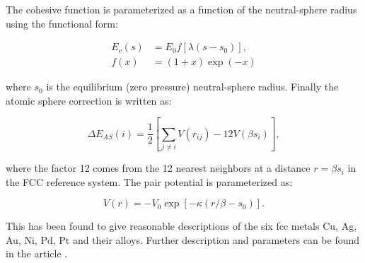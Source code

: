 The cohesive function is parameterized as a function
of the neutral-sphere radius using the functional form:

\begin{equation}
    \begin{split}
        E_c (s) &= E_0 f\left[ \lambda \left( s - s_0 \right) \right], \\
        f\left( x \right) &= \left( 1 + x \right) \exp \left( - x \right)
    \end{split}
\end{equation}

where $s_0$ is the equilibrium (zero pressure) neutral-sphere radius.
Finally the atomic sphere correction is written as:

\begin{equation}
    \Delta E_{AS}(i) = \frac{1}{2} \left[ \sum_{j \neq i} V(r_{ij})
    - 12 V(\beta s_i) \right],
\end{equation}

where the factor 12 comes from the 12 nearest neighbors at
a distance $r = \beta s_i$ in the FCC reference system.
The pair potential is parameterized as:

\begin{equation}
    V(r) = - V_0 \exp \left[ - \kappa \left( r/\beta - s_0 \right) \right] .
\end{equation}

This has been found to give reasonable descriptions
of the six fcc metals Cu, Ag, Au, Ni, Pd, Pt and their alloys.
Further description and parameters can be found in the article
\parencite[Jacobsen, K.W.;
Stoltze, P. and Nørskov, J.K.]{jacobsen1996semi}.
